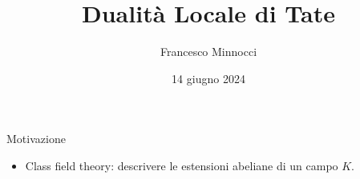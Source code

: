 \documentclass[pdf]{beamer}
\title{Dualità Locale di Tate}
\date{14 giugno 2024}
\author{Francesco Minnocci}
\newcommand{\Q}{\mathbb{Q}}
\begin{document}
    \begin{frame}
\titlepage
    \end{frame}

    \begin{frame}{Motivazione}
        \begin{itemize}
            \item<1-> Class field theory: descrivere le estensioni abeliane di un campo $K$.
        \end{itemize}
    \end{frame}
\end{document}

